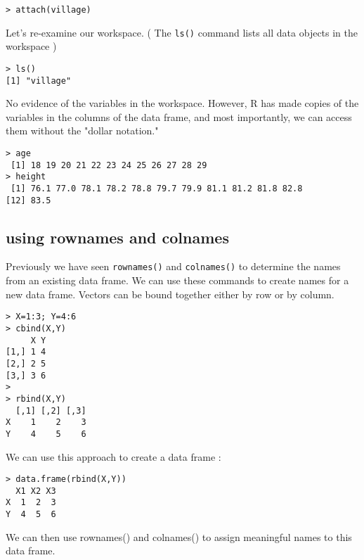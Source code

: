\documentclass[11pt]{article} %
\begin{document}
\begin{verbatim}
> attach(village)
\end{verbatim}

Let's re-examine our workspace. ( The \texttt{ls()} command lists all data objects in the workspace )
\begin{verbatim}
> ls()
[1] "village"
\end{verbatim}

No evidence of the variables in the workspace. However, R has made copies of the variables in the columns of the data frame, and most importantly, we can access them without the "dollar notation."
\begin{verbatim}
> age
 [1] 18 19 20 21 22 23 24 25 26 27 28 29
> height
 [1] 76.1 77.0 78.1 78.2 78.8 79.7 79.9 81.1 81.2 81.8 82.8
[12] 83.5
\end{verbatim}
\subsection{using rownames and colnames}
Previously we have seen \texttt{rownames()} and \texttt{colnames()} to determine the names from an existing data frame. We can use these commands to create names for a new data frame.
Vectors can be bound together either by row or by column.
\begin{verbatim}
> X=1:3; Y=4:6
> cbind(X,Y)
     X Y
[1,] 1 4
[2,] 2 5
[3,] 3 6
>
> rbind(X,Y)
  [,1] [,2] [,3]
X    1    2    3
Y    4    5    6
\end{verbatim}

We can use this approach to create a data frame :

\begin{verbatim}
> data.frame(rbind(X,Y))
  X1 X2 X3
X  1  2  3
Y  4  5  6
\end{verbatim}

We can then use rownames() and colnames() to assign meaningful names to this data frame.
\end{document}
